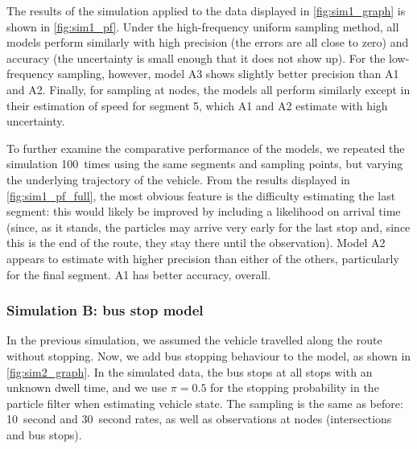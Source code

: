 The results of the simulation applied to the data displayed in \cref{fig:sim1_graph} is shown in \cref{fig:sim1_pf}. Under the high-frequency uniform sampling method, all models perform similarly with high precision (the errors are all close to zero) and accuracy (the uncertainty is small enough that it does not show up). For the low-frequency sampling, however, model A3 shows slightly better precision than A1 and A2. Finally, for sampling at nodes, the models all perform similarly except in their estimation of speed for segment 5, which A1 and A2 estimate with high uncertainty.


To further examine the comparative performance of the models, we repeated the simulation 100~times using the same segments and sampling points, but varying the underlying trajectory of the vehicle. From the results displayed in \cref{fig:sim1_pf_full}, the most obvious feature is the difficulty estimating the last segment: this would likely be improved by including a likelihood on arrival time (since, as it stands, the particles may arrive very early for the last stop and, since this is the end of the route, they stay there until the observation). Model A2 appears to estimate with higher precision than either of the others, particularly for the final segment. A1 has better accuracy, overall.



\subsubsection{Simulation B: bus stop model}
\label{sec:vehicle_sim_B}

In the previous simulation, we assumed the vehicle travelled along the route without stopping. Now, we add bus stopping behaviour to the model, as shown in \cref{fig:sim2_graph}. In the simulated data, the bus stops at all stops with an unknown dwell time, and we use $\pi=0.5$ for the stopping probability in the particle filter when estimating vehicle state. The sampling is the same as before: 10~second and 30~second rates, as well as observations at nodes (intersections and bus stops).






